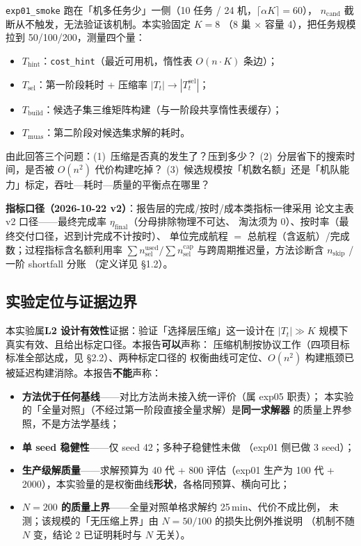 \documentclass[a4paper,11pt]{article}
\newcommand{\fname}[1]{{\ttfamily\seqsplit{#1}}}
\begin{document}
\texttt{exp01\_smoke} 跑在「机多任务少」一侧（10 任务 / 24 机，$\lceil\alpha K\rceil = 60$），
$n_{\mathrm{cand}}$ 截断从不触发，无法验证该机制。本实验固定 $K = 8$
（8 巢 × 容量 4），把任务规模拉到 50/100/200，测量四个量：

\begin{itemize}
  \item $T_{\mathrm{hint}}$：\texttt{cost\_hint}（最近可用机，惰性表 $O(n \cdot K)$ 条边）；
  \item $T_{\mathrm{sel}}$：第一阶段耗时 + 压缩率 $|T_t| \to |T_t^{\mathrm{sel}}|$；
  \item $T_{\mathrm{build}}$：候选子集三维矩阵构建（与一阶段共享惰性表缓存）；
  \item $T_{\mathrm{muas}}$：第二阶段对候选集求解的耗时。
\end{itemize}

由此回答三个问题：(1)~压缩是否真的发生了？压到多少？
(2)~分层省下的搜索时间，是否被 $O(n^2)$ 代价构建吃掉？
(3)~候选规模按「机数名额」还是「机队能力」标定，吞吐—耗时—质量的平衡点在哪里？

\textbf{指标口径（2026-10-22 v2）}：报告层的完成/按时/成本类指标一律采用
论文主表 v2 口径——最终完成率 $\eta_{\mathrm{final}}$（分母排除物理不可达、
淘汰须为 0）、按时率（最终交付口径，迟到计完成不计按时）、
单位完成航程 $=$ 总航程（含返航）/完成数；过程指标含名额利用率
$\sum n_{\mathrm{sel}}^{\mathrm{used}}/\sum n_{\mathrm{sel}}^{\mathrm{cap}}$
与跨周期推迟量，方法诊断含 $n_{\mathrm{skip}}$ / 一阶 shortfall 分账
（定义详见 \fname{exp01\_smoke/report.tex} \S 1.2）。

\subsection{实验定位与证据边界}

本实验属\textbf{L2 设计有效性}证据：验证「选择层压缩」这一设计在
$|T_t| \gg K$ 规模下真实有效、且给出标定口径。本报告\textbf{可以}声称：
压缩机制按协议工作（四项目标标准全部达成，见 \S 2.2）、两种标定口径的
权衡曲线可定位、$O(n^2)$ 构建瓶颈已被延迟构建消除。本报告\textbf{不能}声称：

\begin{itemize}
  \item \textbf{方法优于任何基线}——对比方法尚未接入统一评价（属 exp05 职责）；
        本实验的「全量对照」（不经过第一阶段直接全量求解）是\textbf{同一求解器}
        的质量上界参照，不是方法学基线；
  \item \textbf{单 seed 稳健性}——仅 seed 42；多种子稳健性未做
        （exp01 侧已做 3 seed）；
  \item \textbf{生产级解质量}——求解预算为 40 代 + 800 评估（exp01 生产为
        100 代 + 2000），本实验量的是权衡曲线\textbf{形状}，各格同预算、横向可比；
  \item \textbf{$N{=}200$ 的质量上界}——全量对照单格求解约 25\,min、代价不成比例，
        未测；该规模的「无压缩上界」由 $N{=}50/100$ 的损失比例外推说明
        （机制不随 $N$ 变，结论 2 已证明耗时与 $N$ 无关）。
\end{itemize}
\end{document}

